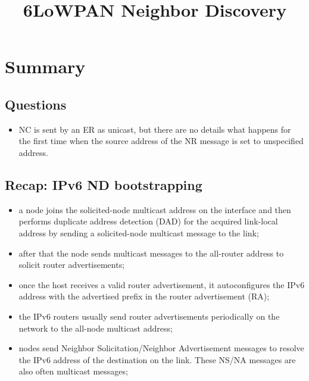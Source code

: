 \documentclass[a4paper,11pt,oneside]{article}
\title{6LoWPAN Neighbor Discovery}
\begin{document}
 
\maketitle
\section{Summary}
\subsection{Questions}
\begin{itemize}
\item NC is sent by an ER as unicast, but there are no details what happens for the first time when the source address of the NR message is set to unspecified address.
\end{itemize}

\subsection{Recap: IPv6 ND bootstrapping}
\begin{itemize}
\item a node joins the solicited-node multicast address on the interface and then performs duplicate address detection (DAD) for the acquired link-local address by sending a solicited-node multicast message to the link;
\item after that the node sends multicast messages to the all-router address to solicit router advertisements;
\item once the host receives a valid router advertisement, it autoconfigures the IPv6 address with the advertised prefix in the router advertisement (RA);
\item the IPv6 routers usually send router advertisements periodically on the network to the all-node multicast address;
\item nodes send Neighbor Solicitation/Neighbor Advertisement messages to resolve the IPv6 address of the
destination on the link. These NS/NA messages are also often multicast messages;
\end{itemize}
\end{document}
